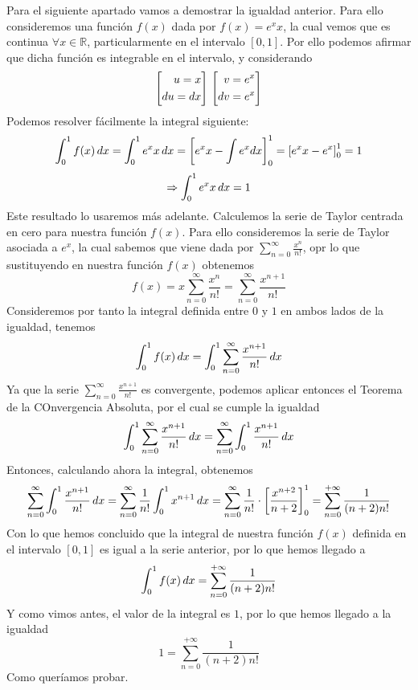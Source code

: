 \documentclass[fleqn]{article}
\def\R{\mathds{R}}
\begin{document}
    Para el siguiente apartado vamos a demostrar la igualdad anterior. Para ello consideremos una función $f(x)$ dada por
     $f(x) = e^x x$, la cual vemos que es continua $\forall x \in \R$,
    particularmente en el intervalo $[0,1]$. Por ello podemos afirmar que dicha función es integrable en el intervalo, y considerando 
    \begin{equation*}
        \left[
        \begin{aligned}
            u = x \\
            du = dx
        \end{aligned}
        \right]\\
        \left[
        \begin{aligned}
            v = e^x \\
            dv = e^x
        \end{aligned}
        \right]
    \end{equation*}
    Podemos resolver fácilmente la integral siguiente:
    $$\int_0^1 f(x) \thinspace dx = \int_0^1 e^x x \thinspace dx = \left[e^x x - \int e^x dx \right]_0^1 = \left[e^x x - e^x \right]_0^1 = 1 $$
    $$\Rightarrow \int_0^1 e^x x \thinspace dx = 1$$
    Este resultado lo usaremos más adelante. Calculemos la serie de Taylor centrada en cero para nuestra función $f(x)$. Para ello consideremos la serie de Taylor 
    asociada a $e^x$, la cual sabemos que viene dada por $\sum_{n=0}^{\infty} \frac{x^n}{n!}$, opr lo que sustituyendo en nuestra función $f(x)$ obtenemos
    $$f(x) = x \sum_{n=0}^{\infty} \frac{x^n}{n!} = \sum_{n=0}^{\infty} \frac{x^{n+1}}{n!}$$
    Consideremos por tanto la integral definida entre $0$ y $1$ en ambos lados de la igualdad, tenemos
    $$\int_0^1f(x) \thinspace dx = \int_0^1 \sum_{n=0}^{\infty} \frac{x^{n+1}}{n!} \thinspace dx$$
    Ya que la serie $\sum_{n=0}^{\infty} \frac{x^{n+1}}{n!}$ es convergente, podemos aplicar entonces el Teorema de la COnvergencia Absoluta, por el cual se cumple
    la igualdad
    $$\int_0^1 \sum_{n=0}^{\infty} \frac{x^{n+1}}{n!} \thinspace dx = \sum_{n=0}^{\infty} \int_0^1 \frac{x^{n+1}}{n!} \thinspace dx$$
    Entonces, calculando ahora la integral, obtenemos
    $$\sum_{n=0}^{\infty} \int_0^1 \frac{x^{n+1}}{n!} \thinspace dx = \sum_{n=0}^{\infty} \frac{1}{n!} \int_0^1 x^{n+1} \thinspace dx = 
    \sum_{n=0}^{\infty} \frac{1}{n!} \cdot \left[\frac{x^{n+2}}{n+2}\right]_0^1 = \sum_{n=0}^{+\infty} \frac{1}{(n+2)n!} $$
    Con lo que hemos concluido que la integral de nuestra función $f(x)$ definida en el intervalo $[0,1]$ es igual a la serie anterior, por lo que hemos llegado a 
    $$\int_0^1 f(x) \thinspace dx = \sum_{n=0}^{+\infty} \frac{1}{(n+2)n!} $$
    Y como vimos antes, el valor de la integral es $1$, por lo que hemos llegado a la igualdad
    $$1 = \sum_{n=0}^{+\infty} \frac{1}{(n+2)n!}$$
    Como queríamos probar.
   
\end{document}

